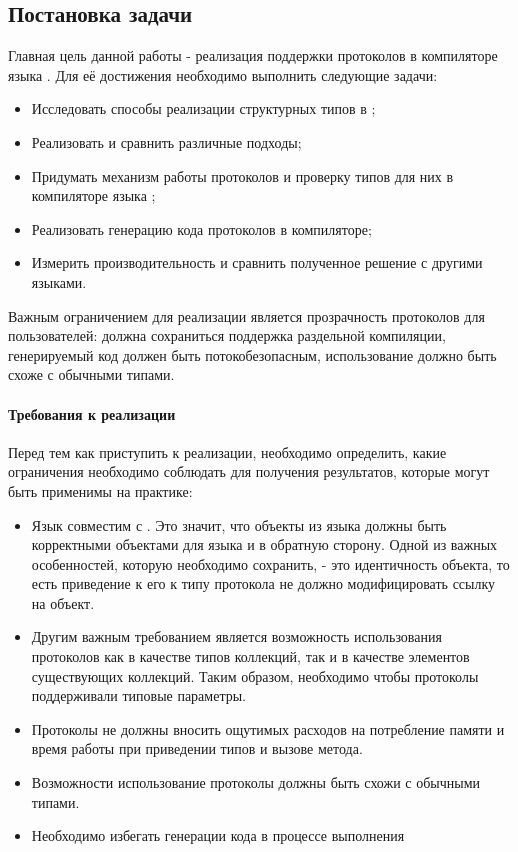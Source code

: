\subsection{Постановка задачи}
Главная цель данной работы - реализация поддержки протоколов в компиляторе языка . Для её достижения необходимо выполнить следующие задачи:
\begin{itemize}
    \item Исследовать способы реализации структурных типов в ;
    \item Реализовать и сравнить различные подходы;
    \item Придумать механизм работы протоколов и проверку типов для них в компиляторе языка ;
    \item Реализовать генерацию кода протоколов в компиляторе;
    \item Измерить производительность и сравнить полученное решение с другими языками.
\end{itemize}

Важным ограничением для реализации является прозрачность протоколов для пользователей: должна сохраниться поддержка раздельной компиляции, генерируемый код должен быть потокобезопасным, использование должно быть схоже с обычными типами.

\paragraph{Требования к реализации}
Перед тем как приступить к реализации, необходимо определить, какие ограничения необходимо соблюдать для получения результатов, которые могут быть применимы на практике:

\begin{itemize}
  \item Язык  совместим с . Это значит, что объекты из языка  должны быть корректными объектами для языка  и в обратную сторону. Одной из важных особенностей, которую необходимо сохранить, - это идентичность объекта, то есть приведение к его к типу протокола не должно модифицировать ссылку на объект.
  \item Другим важным требованием является возможность использования протоколов как в качестве типов коллекций, так и в качестве элементов существующих коллекций. Таким образом, необходимо чтобы протоколы поддерживали типовые параметры.
  \item Протоколы не должны вносить ощутимых расходов на потребление памяти и время работы при приведении типов и вызове метода.
  \item Возможности использование протоколы должны быть схожи с обычными типами.
  \item Необходимо избегать генерации кода в процессе выполнения
\end{itemize}
